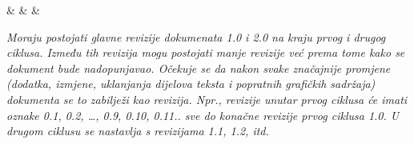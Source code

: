 \begin{longtabu}
			&  &  & \\[3pt] \hline
			
			
		\end{longtabu}
	
	
		\textit{Moraju postojati glavne revizije dokumenata 1.0 i 2.0 na kraju prvog i drugog ciklusa. Između tih revizija mogu postojati manje revizije već prema tome kako se dokument bude nadopunjavao. Očekuje se da nakon svake značajnije promjene (dodatka, izmjene, uklanjanja dijelova teksta i popratnih grafičkih sadržaja) dokumenta se to zabilježi kao revizija. Npr., revizije unutar prvog ciklusa će imati oznake 0.1, 0.2, …, 0.9, 0.10, 0.11.. sve do konačne revizije prvog ciklusa 1.0. U drugom ciklusu se nastavlja s revizijama 1.1, 1.2, itd.}
